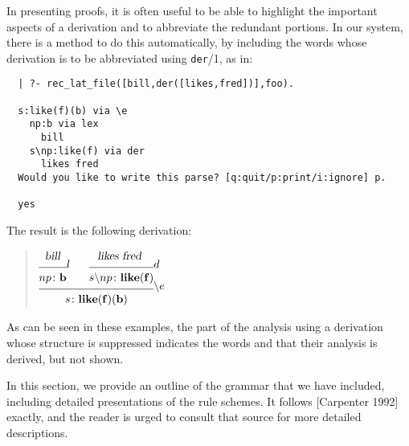 In presenting proofs, it is often useful to be able to highlight the
important aspects of a derivation and to abbreviate the redundant
portions.  In our system, there is a method to do this automatically,
by including the words whose derivation is to be abbreviated using
{\tt der}/1, as in:
%
\begin{verbatim}
  | ?- rec_lat_file([bill,der([likes,fred])],foo).
  
  s:like(f)(b) via \e
    np:b via lex
      bill
    s\np:like(f) via der
      likes fred 
  Would you like to write this parse? [q:quit/p:print/i:ignore] p.
  
  yes
\end{verbatim}
%
The result is the following derivation:
%
\begin{quote}
\small
$
\infr{\infr{\men{bill}}
           {\synsem{np}
                   {\con{b}}}
           {\lexr}
      \qquad
      \infr{\men{likes fred }}
           {\synsem{\bk{s}
                       {np}}
                   {\con{like}
                    (\con{f})}}
           {\der}}
     {\synsem{s}
             {\con{like}
              (\con{f})
              (\con{b})}}
     {\bel}
$
\end{quote}  
%
As can be seen in these examples, the part of the analysis using a
derivation whose structure is suppressed indicates the words and that
their analysis is derived, but not shown.



In this section, we provide an outline of the grammar that we have
included, including detailed presentations of the rule schemes.  It
follows [Carpenter 1992] exactly, and the reader is urged to consult
that source for more detailed descriptions.



